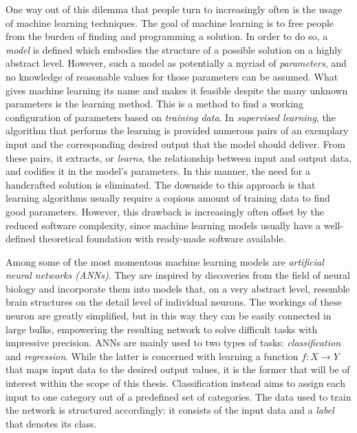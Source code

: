 \documentclass[11pt, a4paper]{article}
\begin{document}
One way out of this dilemma that people turn to increasingly often is the usage of machine learning techniques. The goal of machine learning is to free people from the burden of finding and programming a solution. In order to do so, a \emph{model} is defined which embodies the structure of a possible solution on a highly abstract level. However, such a model as potentially a myriad of \emph{parameters}, and no knowledge of reasonable values for those parameters can be assumed. What gives machine learning its name and makes it feasible despite the many unknown parameters is the learning method. This is a method to find a working configuration of parameters based on \emph{training data}. In \emph{supervised learning}, the algorithm that performs the learning is provided numerous pairs of an exemplary input and the corresponding desired output that the model should deliver. From these pairs, it extracts, or \emph{learns}, the relationship between input and output data, and codifies it in the model's parameters. In this manner, the need for a handcrafted solution is eliminated. The downside to this approach is that learning algorithms usually require a copious amount of training data to find good parameters. However, this drawback is increasingly often offset by the reduced software complexity, since machine learning models usually have a well-defined theoretical foundation with ready-made software available.

Among some of the most momentous machine learning models are \emph{artificial neural networks (ANNs)}. They are inspired by discoveries from the field of neural biology and incorporate them into models that, on a very abstract level, resemble brain structures on the detail level of individual neurons. The workings of these  neuron are greatly simplified, but in this way they can be easily connected in large bulks, empowering the resulting network to solve difficult tasks with impressive precision. ANNs are mainly used to two types of tasks: \emph{classification} and \emph{regression}. While the latter is concerned with learning a function $f: X \rightarrow Y$ that maps input data to the desired output values, it is the former that will be of interest within the scope of this thesis. Classification instead aims to assign each input to one category out of a predefined set of categories. The data used to train the network is structured accordingly: it consists of the input data and a \emph{label} that denotes its class.
\end{document}
